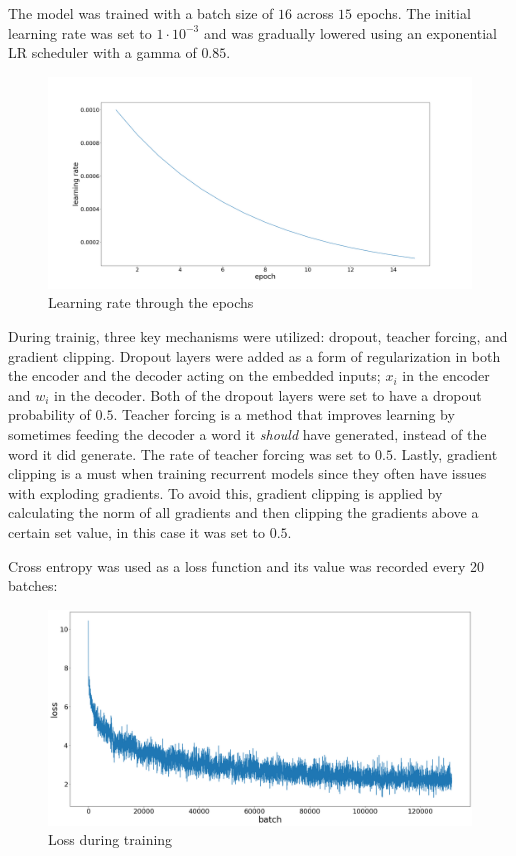 \documentclass{article}
\begin{document}
The model was trained with a batch size of $16$ across $15$ epochs. The initial learning rate was set to $1\cdot10^{-3}$ and was gradually lowered using an exponential LR scheduler with a gamma of $0.85$. 
\begin{figure}[H]
    \centering
    \includegraphics[scale=0.25]{images/lr_epochs.png}
    \caption{Learning rate through the epochs}
\end{figure}

During trainig, three key mechanisms were utilized: dropout, teacher forcing, and gradient clipping. Dropout layers were added as a form of regularization in both the encoder and the decoder acting on the embedded inputs; $x_i$ in the encoder and $w_i$ in the decoder. Both of the dropout layers were set to have a dropout probability of $0.5$. Teacher forcing is a method that improves learning by sometimes feeding the decoder a word it \textit{should} have generated, instead of the word it did generate. The rate of teacher forcing was set to $0.5$. Lastly, gradient clipping is a must when training recurrent models since they often have issues with exploding gradients. To avoid this, gradient clipping is applied by calculating the norm of all gradients and then clipping the gradients above a certain set value, in this case it was set to $0.5$.

Cross entropy was used as a loss function and its value was recorded every 20 batches:
\begin{figure}[H]
    \centering
    \includegraphics[scale=0.25]{images/train_loss.png}
    \caption{Loss during training}
\end{figure}
\end{document}
